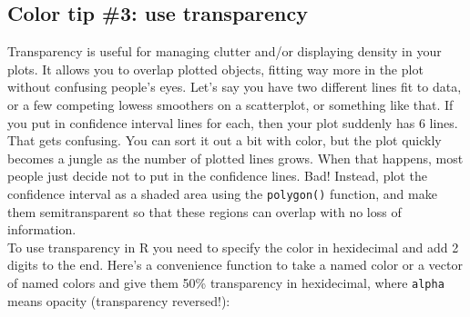 \documentclass[a4paper]{article}
\begin{document}
\subsection{Color tip \#3: use transparency}
Transparency is useful for managing clutter and/or displaying density in your plots. It allows you to overlap plotted objects, fitting way more in the plot without confusing people's eyes. Let's say you have two different lines fit to data, or a few competing lowess smoothers on a scatterplot, or something like that. If you put in confidence interval lines for each, then your plot suddenly has 6 lines. That gets confusing. You can sort it out a bit with color, but the plot quickly becomes a jungle as the number of plotted lines grows. When that happens, most people just decide not to put in the confidence lines. Bad! Instead, plot the confidence interval as a shaded area using the \texttt{polygon()} function, and make them semitransparent so that these regions can overlap with no loss of information.\\

To use transparency in R you need to specify the color in hexidecimal and add 2 digits to the end. Here's a convenience function to take a named color or a vector of named colors and give them 50\% transparency in hexidecimal, where \texttt{alpha} means opacity (transparency reversed!):
\end{document}
